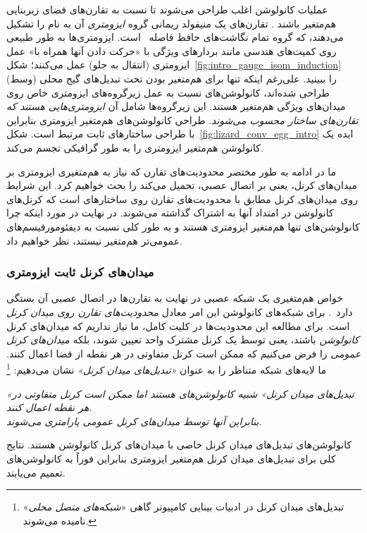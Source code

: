 عملیات کانولوشن اغلب طراحی می‌شوند تا نسبت به تقارن‌های فضای زیربنایی هم‌متغیر باشند \cite{Cohen2016-GCNN,Kondor2018-GENERAL}.
تقارن‌های یک منیفولد ریمانی گروه \emph{ایزومتری} آن به نام  را تشکیل می‌دهند، که گروه تمام نگاشت‌های حافظ فاصله~ است.
ایزومتری‌ها به طور طبیعی روی کمیت‌های هندسی مانند بردارهای ویژگی با «حرکت دادن آنها همراه با» عمل ایزومتری (انتقال به جلو) عمل می‌کنند؛ شکل~\ref{fig:intro_gauge_isom_induction} (وسط) را ببینید.
علی‌رغم اینکه تنها برای هم‌متغیر بودن تحت تبدیل‌های گیج محلی طراحی شده‌اند،
کانولوشن‌های \lr{$\GM$} نسبت به عمل زیرگروه‌های ایزومتری خاص  روی میدان‌های ویژگی هم‌متغیر هستند.
این زیرگروه‌ها  شامل آن \emph{ایزومتری‌هایی هستند که تقارن‌های ساختار  محسوب می‌شوند}.
طراحی کانولوشن‌های \lr{$\GM$} هم‌متغیر ایزومتری بنابراین با طراحی ساختارهای  ثابت مرتبط است.
شکل~\ref{fig:lizard_conv_egg_intro} ایده یک کانولوشن \lr{$\GM$} هم‌متغیر ایزومتری را به طور گرافیکی تجسم می‌کند.


ما در ادامه به طور مختصر محدودیت‌های تقارن که نیاز به هم‌متغیری ایزومتری بر میدان‌های کرنل، یعنی بر اتصال عصبی، تحمیل می‌کند را بحث خواهیم کرد.
این شرایط روی میدان‌های کرنل مطابق با محدودیت‌های تقارن روی ساختارهای  است که کرنل‌های کانولوشن در امتداد آنها به اشتراک گذاشته می‌شوند.
در نهایت در مورد اینکه چرا کانولوشن‌های \lr{$\GM$} تنها هم‌متغیر ایزومتری هستند و به طور کلی نسبت به دیفئومورفیسم‌های عمومی‌تر هم‌متغیر نیستند، نظر خواهیم داد.






\pagebreak






\subsubsection{میدان‌های کرنل ثابت ایزومتری}
\label{sec:visual_intro_inv_kernel_fields}

خواص هم‌متغیری یک شبکه عصبی
در نهایت به تقارن‌ها در اتصال عصبی آن بستگی دارد~\cite{ravanbakhsh2017EquivarianceParameterSharing}.
برای شبکه‌های کانولوشن این امر معادل \emph{محدودیت‌های تقارن روی میدان کرنل} است.
برای مطالعه این محدودیت‌ها در کلیت کامل، ما نیاز نداریم که میدان‌های کرنل \emph{کانولوشن} باشند، یعنی توسط یک کرنل مشترک واحد تعیین شوند،
بلکه \emph{میدان‌های کرنل عمومی} را فرض می‌کنیم که ممکن است کرنل متفاوتی در هر نقطه از فضا اعمال کنند.
ما لایه‌های شبکه متناظر را به عنوان \emph{«تبدیل‌های میدان کرنل»} نشان می‌دهیم:%
\footnote{
	تبدیل‌های میدان کرنل در ادبیات بینایی کامپیوتر گاهی «\emph{شبکه‌های متصل محلی}» نامیده می‌شوند.
}
\begin{center}\it
	«تبدیل‌های میدان کرنل» شبیه کانولوشن‌های \lr{$\GM$} هستند اما ممکن است کرنل متفاوتی در هر نقطه اعمال کنند. \\
	بنابراین آنها توسط میدان‌های کرنل عمومی پارامتری می‌شوند.
\end{center}
کانولوشن‌های \lr{$\GM$} تبدیل‌های میدان کرنل خاصی با میدان‌های کرنل کانولوشن \lr{$\GM$} هستند.
نتایج کلی برای تبدیل‌های میدان کرنل هم‌متغیر ایزومتری بنابراین فوراً به کانولوشن‌های \lr{$\GM$} تعمیم می‌یابند.


